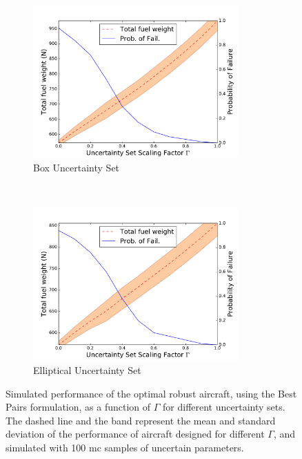 \begin{figure}[ht]
    \centering
    \captionsetup{justification=centering, font=small}
    \begin{subfigure}{0.49\textwidth}
        \centering
        \includegraphics[height=2.3in]{signomial_simple_flight/box_best_pairs.pdf}
         \caption{Box Uncertainty Set}
    \end{subfigure}%
    ~ 
    \begin{subfigure}{0.49\textwidth}
        \centering
        \includegraphics[height=2.3in]{signomial_simple_flight/ell_best_pairs.pdf}
         \caption{Elliptical Uncertainty Set}
    \end{subfigure}
    \caption{Simulated performance of the optimal robust aircraft, using the Best Pairs formulation,
    as a function of $\Gamma$ for different uncertainty sets.
    The dashed line and the band represent the mean and standard deviation of the performance
    of aircraft designed for different $\Gamma$,
    and simulated with 100 \gls{mc} samples of uncertain parameters.}
    \label{fig:probOfFailure}
\end{figure}

